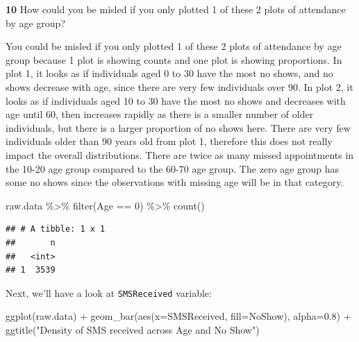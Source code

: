 \documentclass[
]{article}
\newenvironment{Shaded}{\begin{snugshade}}{\end{snugshade}}
\newcommand{\AttributeTok}[1]{\textcolor[rgb]{0.77,0.63,0.00}{#1}}
\newcommand{\DecValTok}[1]{\textcolor[rgb]{0.00,0.00,0.81}{#1}}
\newcommand{\FloatTok}[1]{\textcolor[rgb]{0.00,0.00,0.81}{#1}}
\newcommand{\FunctionTok}[1]{\textcolor[rgb]{0.00,0.00,0.00}{#1}}
\newcommand{\NormalTok}[1]{#1}
\newcommand{\SpecialCharTok}[1]{\textcolor[rgb]{0.00,0.00,0.00}{#1}}
\newcommand{\StringTok}[1]{\textcolor[rgb]{0.31,0.60,0.02}{#1}}
\begin{document}
\textbf{10} How could you be misled if you only plotted 1 of these 2
plots of attendance by age group?

You could be misled if you only plotted 1 of these 2 plots of attendance
by age group because 1 plot is showing counts and one plot is showing
proportions. In plot 1, it looks as if individuals aged 0 to 30 have the
most no shows, and no shows decrease with age, since there are very few
individuals over 90. In plot 2, it looks as if individuals aged 10 to 30
have the most no shows and decreases with age until 60, then increases
rapidly as there is a smaller number of older individuals, but there is
a larger proportion of no shows here. There are very few individuals
older than 90 years old from plot 1, therefore this does not really
impact the overall distributions. There are twice as many missed
appointments in the 10-20 age group compared to the 60-70 age group. The
zero age group has some no shows since the observations with missing age
will be in that category.

\begin{Shaded}
\begin{Highlighting}[]
\NormalTok{raw.data }\SpecialCharTok{\%\textgreater{}\%} \FunctionTok{filter}\NormalTok{(Age }\SpecialCharTok{==} \DecValTok{0}\NormalTok{) }\SpecialCharTok{\%\textgreater{}\%} \FunctionTok{count}\NormalTok{()}
\end{Highlighting}
\end{Shaded}

\begin{verbatim}
## # A tibble: 1 x 1
##       n
##   <int>
## 1  3539
\end{verbatim}

Next, we'll have a look at \texttt{SMSReceived} variable:

\begin{Shaded}
\begin{Highlighting}[]
\FunctionTok{ggplot}\NormalTok{(raw.data) }\SpecialCharTok{+} 
  \FunctionTok{geom\_bar}\NormalTok{(}\FunctionTok{aes}\NormalTok{(}\AttributeTok{x=}\NormalTok{SMSReceived, }\AttributeTok{fill=}\NormalTok{NoShow), }\AttributeTok{alpha=}\FloatTok{0.8}\NormalTok{) }\SpecialCharTok{+} 
  \FunctionTok{ggtitle}\NormalTok{(}\StringTok{"Density of SMS received across Age and No Show"}\NormalTok{)}
\end{Highlighting}
\end{Shaded}
\end{document}
